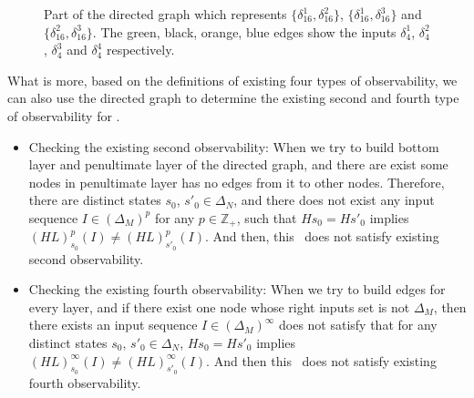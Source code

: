 \begin{figure}[thpb]
      \centering
      
      \caption{Part of the directed graph which represents $\{\delta_{16}^1,\delta_{16}^2\}$, $\{\delta_{16}^1,\delta_{16}^3\}$ and $\{\delta_{16}^2,\delta_{16}^3\}$. The green, black, orange, blue edges show the inputs $\delta_4^1$, $\delta_4^2$, $\delta_4^3$ and $\delta_4^4$ respectively.}
      \label{fig:4}
   \end{figure}

What is more, based on the definitions of existing four types of observability, we can also use the directed graph to determine the existing second and fourth type of observability for \BCNs. 
\begin{itemize}
 \item Checking the existing second observability: When we try to build bottom layer and penultimate layer of the directed graph, and there are exist some nodes in penultimate layer has no edges from it to other nodes. 
 Therefore, there are distinct states $s_0$, ${s'}_0 \in \Delta_N$, and there does not exist any input sequence $I\in(\Delta_M)^p$ for any $p\in \mathbb{Z}_+$, such that $Hs_0=H{s'}_0$ implies $(HL)^p_{s_0}(I)\neq (HL)^p_{{s'}_0}(I)$.
 And then, this \BCN\ does not satisfy existing second observability.
 \item  Checking the existing fourth observability: When we try to build edges for every layer, and if there exist one node whose right inputs set is not $\Delta_M$, 
 then there exists an input sequence $I\in(\Delta_M)^{\infty}$ does not satisfy that for any distinct states $s_0$, ${s'}_0 \in \Delta_N$, $Hs_0=H{s'}_0$ implies $(HL)^{\infty}_{s_0}(I)\neq (HL)^{\infty}_{{s'}_0}(I)$. And then this \BCN\ does not satisfy existing fourth observability.
 \end{itemize}



